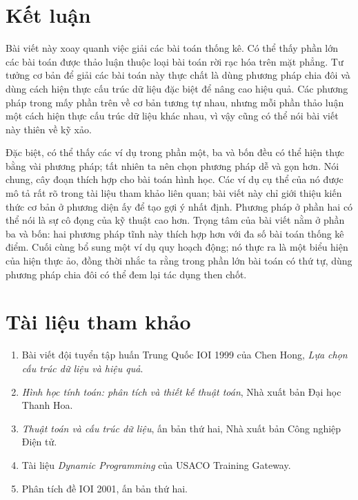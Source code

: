 \documentclass[11pt]{article}
\begin{document}
\section*{Kết luận}

Bài viết này xoay quanh việc giải các bài toán thống kê. Có thể thấy phần lớn
các bài toán được thảo luận thuộc loại bài toán rời rạc hóa trên mặt phẳng.
Tư tưởng cơ bản để giải các bài toán này thực chất là dùng phương pháp chia
đôi và dùng cách hiện thực cấu trúc dữ liệu đặc biệt để nâng cao hiệu quả.
Các phương pháp trong mấy phần trên về cơ bản tương tự nhau, nhưng mỗi phần
thảo luận một cách hiện thực cấu trúc dữ liệu khác nhau, vì vậy cũng có thể
nói bài viết này thiên về kỹ xảo.

Đặc biệt, có thể thấy các ví dụ trong phần một, ba và bốn đều có thể hiện
thực bằng vài phương pháp; tất nhiên ta nên chọn phương pháp dễ và gọn hơn.
Nói chung, cây đoạn thích hợp cho bài toán hình học. Các ví dụ cụ thể của nó
được mô tả rất rõ trong tài liệu tham khảo liên quan; bài viết này chỉ giới
thiệu kiến thức cơ bản ở phương diện ấy để tạo gợi ý nhất định. Phương pháp ở
phần hai có thể nói là sự cô đọng của kỹ thuật cao hơn. Trọng tâm của bài
viết nằm ở phần ba và bốn: hai phương pháp tĩnh này thích hợp hơn với đa số
bài toán thống kê điểm. Cuối cùng bổ sung một ví dụ quy hoạch động; nó thực
ra là một biểu hiện của hiện thực ảo, đồng thời nhắc ta rằng trong phần lớn
bài toán có thứ tự, dùng phương pháp chia đôi có thể đem lại tác dụng then
chốt.

\section*{Tài liệu tham khảo}

\begin{enumerate}
  \item Bài viết đội tuyển tập huấn Trung Quốc IOI 1999 của Chen Hong,
  \textit{Lựa chọn cấu trúc dữ liệu và hiệu quả}.
  \item \textit{Hình học tính toán: phân tích và thiết kế thuật toán}, Nhà
  xuất bản Đại học Thanh Hoa.
  \item \textit{Thuật toán và cấu trúc dữ liệu}, ấn bản thứ hai, Nhà xuất bản
  Công nghiệp Điện tử.
  \item Tài liệu \textit{Dynamic Programming} của USACO Training Gateway.
  \item Phân tích đề IOI 2001, ấn bản thứ hai.
\end{enumerate}
\end{document}
